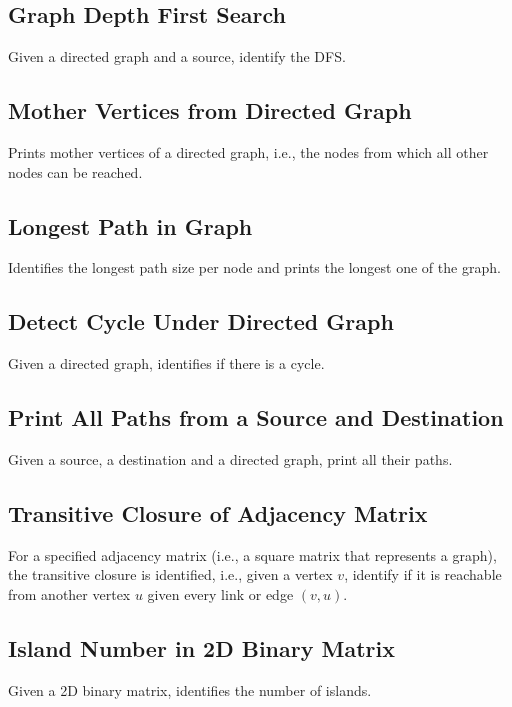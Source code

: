 \documentclass[10pt,bezier]{article}
\begin{document}
\subsection{Graph Depth First Search} \label{section3.2}
Given a directed graph and a source, identify the DFS.

\subsection{Mother Vertices from Directed Graph} \label{section3.3}
Prints mother vertices of a directed graph, i.e., the nodes from which all other nodes can be reached.

\subsection{Longest Path in Graph} \label{section3.4}
Identifies the longest path size per node and prints the longest one of the graph.

\subsection{Detect Cycle Under Directed Graph} \label{section3.5}
Given a directed graph, identifies if there is a cycle.

\subsection{Print All Paths from a Source and Destination} \label{section3.6}
Given a source, a destination and a directed graph, print all their paths.

\subsection{Transitive Closure of Adjacency Matrix} \label{section3.7}
For a specified adjacency matrix (i.e., a square matrix that represents a graph), the transitive closure is identified, i.e., given a vertex $v$, identify if it is reachable from another vertex $u$ given every link or edge $(v,u)$.

\subsection{Island Number in 2D Binary Matrix} \label{section3.8}
Given a 2D binary matrix, identifies the number of islands.

\newpage
\end{document}
